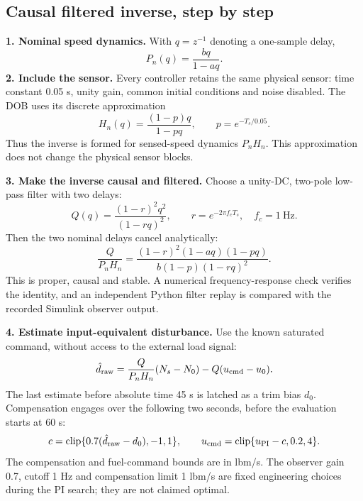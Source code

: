 \subsection{Causal filtered inverse, step by step}
\textbf{1. Nominal speed dynamics.} With $q=z^{-1}$ denoting a one-sample delay,
\begin{equation}P_n(q)=\frac{bq}{1-aq}.\end{equation}
\textbf{2. Include the sensor.} Every controller retains the same physical sensor: time constant 0.05 s, unity gain, common initial conditions and noise disabled. The DOB uses its discrete approximation
\begin{equation}H_n(q)=\frac{(1-p)q}{1-pq},\qquad p=e^{-T_s/0.05}.\end{equation}
Thus the inverse is formed for sensed-speed dynamics $P_nH_n$. This approximation does not change the physical sensor blocks.

\textbf{3. Make the inverse causal and filtered.} Choose a unity-DC, two-pole low-pass filter with two delays:
\begin{equation}Q(q)=\frac{(1-r)^2q^2}{(1-rq)^2},\qquad r=e^{-2\pi f_cT_s},\quad f_c=1\ \mathrm{Hz}.\end{equation}
Then the two nominal delays cancel analytically:
\begin{equation}\frac{Q}{P_nH_n}=\frac{(1-r)^2(1-aq)(1-pq)}{b(1-p)(1-rq)^2}.\end{equation}
This is proper, causal and stable. A numerical frequency-response check verifies the identity, and an independent Python filter replay is compared with the recorded Simulink observer output.

\textbf{4. Estimate input-equivalent disturbance.} Use the known saturated command, without access to the external load signal:
\begin{equation}\hat d_{\rm raw}=\frac{Q}{P_nH_n}(N_s-N_0)-Q(u_{\rm cmd}-u_0).\end{equation}
The last estimate before absolute time 45 s is latched as a trim bias $d_0$. Compensation engages over the following two seconds, before the evaluation starts at 60 s:
\begin{equation}c=\operatorname{clip}\{0.7(\hat d_{\rm raw}-d_0),-1,1\},\qquad
u_{\rm cmd}=\operatorname{clip}\{u_{\rm PI}-c,0.2,4\}.\end{equation}
The compensation and fuel-command bounds are in lbm/s. The observer gain 0.7, cutoff 1 Hz and compensation limit 1 lbm/s are fixed engineering choices during the PI search; they are not claimed optimal.

